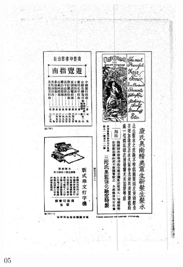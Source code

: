 \documentclass[12pt,twoside]{report}
\begin{document}
\begin{appendices}
\begin{figure}[htbp]
    \begin{subfigure}[b]{0.23\linewidth}
        \includegraphics[width=\linewidth]{./figures/testset/05.jpg}
        \caption{05}
        \label{fig:test_05}
    \end{subfigure}
    \hfill
    \begin{subfigure}[b]{0.23\linewidth}

\end{subfigure}
\end{figure}
\end{appendices}
\end{document}
